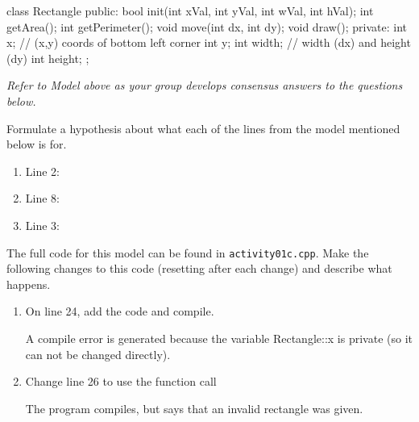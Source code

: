   \begin{center}
    \small
    \begin{minipage}{4in}
      \begin{cpplst}
class Rectangle {
  public:
    bool init(int xVal, int yVal, int wVal, int hVal);
    int getArea();
    int getPerimeter();
    void move(int dx, int dy);
    void draw();
  private:
    int x;       // (x,y) coords of bottom left corner
    int y;
    int width;   // width (dx) and height (dy)
    int height;
};
      \end{cpplst}
    \end{minipage}
  \end{center}
  
  {\it\large Refer to Model \M above as your group develops consensus answers
    to the questions below.}

  \Q Formulate a hypothesis about what each of the lines from the model mentioned below is for.    
    \begin{enumerate}
      \itemsep 10pt
      \item Line 2:  \hfill {}
      \item Line 8: \hfill {}
      \item Line 3:  \hfill {}
    \end{enumerate}
    
  \Q The full code for this model can be found in {\tt activity01c.cpp}.  Make the
    following changes to this code (resetting after each change) and describe what 
    happens.
    \begin{enumerate}
      \item On line 24, add the code  and compile.
        \begin{answer}[0.75in]
          A compile error is generated because the variable Rectangle::x is private (so it
          can not be changed directly).
        \end{answer}

      \item Change line 26 to use the function call 
        \begin{answer}[0.75in]
          The program compiles, but says that an invalid rectangle was given.
        \end{answer}
    \end{enumerate}
    
